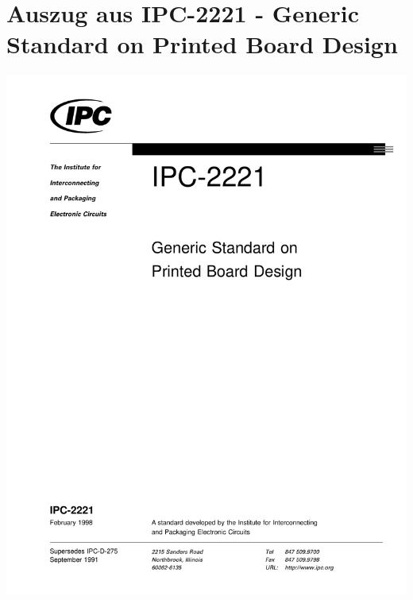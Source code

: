 \section{Auszug aus IPC-2221 - Generic Standard on
Printed Board Design}
\begin{center} \label{app:ipc}
	\includegraphics[page=50,width=0.98\columnwidth]{./datenblaetter/IPC-2221-2}
\end{center}